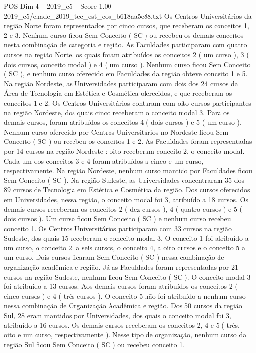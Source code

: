 \begin{textsample}{POS Dim 4 – 2019\_c5 – Score 1.00 – 2019\_c5/enade\_2019\_tec\_est\_cos\_b618aa5e88.txt}
Os Centros Universitários da região Norte foram representados por cinco cursos, que receberam os conceitos 1, 2 e 3.
Nenhum curso ficou Sem Conceito ( SC ) ou recebeu os demais conceitos nesta combinação de categoria e região.
As Faculdades participaram com quatro cursos na região Norte, os quais foram atribuídos os conceitos 2 ( um curso ), 3 ( dois cursos, conceito modal ) e 4 ( um curso ).
Nenhum curso ficou Sem Conceito ( SC ), e nenhum curso oferecido em Faculdades da região obteve conceito 1 e 5.
Na região Nordeste, as Universidades participaram com dois dos 24 cursos da Área de Tecnologia em Estética e Cosmética oferecidos, e que receberam os conceitos 1 e 2.
Os Centros Universitários contaram com oito cursos participantes na região Nordeste, dos quais cinco receberam o conceito modal 3.
Para os demais cursos, foram atribuídos os conceitos 4 ( dois cursos ) e 5 ( um curso ).
Nenhum curso oferecido por Centros Universitários no Nordeste ficou Sem Conceito ( SC ) ou recebeu os conceitos 1 e 2.
As Faculdades foram representadas por 14 cursos na região Nordeste : oito receberam conceito 2, o conceito modal.
Cada um dos conceitos 3 e 4 foram atribuídos a cinco e um curso, respectivamente.
Na região Nordeste, nenhum curso mantido por Faculdades ficou Sem Conceito ( SC ).
Na região Sudeste, as Universidades concentraram 35 dos 89 cursos de Tecnologia em Estética e Cosmética da região.
Dos cursos oferecidos em Universidades, nessa região, o conceito modal foi 3, atribuído a 18 cursos.
Os demais cursos receberam os conceitos 2 ( dez cursos ), 4 ( quatro cursos ) e 5 ( dois cursos ).
Um curso ficou Sem Conceito ( SC ) e nenhum curso recebeu conceito 1.
Os Centros Universitários participaram com 33 cursos na região Sudeste, dos quais 15 receberam o conceito modal 3.
O conceito 1 foi atribuído a um curso, o conceito 2, a seis cursos, o conceito 4, a oito cursos e o conceito 5 a um curso.
Dois cursos ficaram Sem Conceito ( SC ) nessa combinação de organização acadêmica e região.
Já as Faculdades foram representadas por 21 cursos na região Sudeste, nenhum ficou Sem Conceito ( SC ).
O conceito modal 3 foi atribuído a 13 cursos.
Aos demais cursos foram atribuídos os conceitos 2 ( cinco cursos ) e 4 ( três cursos ).
O conceito 5 não foi atribuído a nenhum curso nessa combinação de Organização Acadêmica e região.
Dos 50 cursos da região Sul, 28 eram mantidos por Universidades, dos quais o conceito modal foi 3, atribuído a 16 cursos.
Os demais cursos receberam os conceitos 2, 4 e 5 ( três, oito e um curso, respectivamente ).
Nesse tipo de organização, nenhum curso da região Sul ficou Sem Conceito ( SC ) ou recebeu conceito 1.

\end{textsample}
